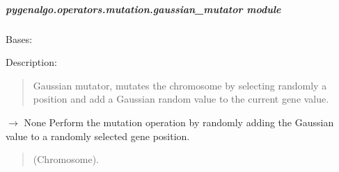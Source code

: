 \documentclass[letterpaper,10pt,english]{sphinxmanual}
\begin{document}
\subparagraph{pygenalgo.operators.mutation.gaussian\_mutator module}
\label{\detokenize{pygenalgo.operators.mutation:module-pygenalgo.operators.mutation.gaussian_mutator}}\label{\detokenize{pygenalgo.operators.mutation:pygenalgo-operators-mutation-gaussian-mutator-module}}

\begin{fulllineitems}
\label{\detokenize{pygenalgo.operators.mutation:pygenalgo.operators.mutation.gaussian_mutator.GaussianMutator}}
\pysigstartsignatures
\pysiglinewithargsret
{}
{}
{}
\pysigstopsignatures
\sphinxAtStartPar
Bases: {\hyperref[\detokenize{pygenalgo.operators.mutation:pygenalgo.operators.mutation.mutate_operator.MutationOperator}]{}}

\sphinxAtStartPar
Description:
\begin{quote}

\sphinxAtStartPar
Gaussian mutator, mutates the chromosome by selecting randomly a position
and add a Gaussian random value to the current gene value.
\end{quote}

\begin{fulllineitems}
\label{\detokenize{pygenalgo.operators.mutation:pygenalgo.operators.mutation.gaussian_mutator.GaussianMutator.mutate}}
\pysigstartsignatures
\pysiglinewithargsret
{}
{}
{{ $\rightarrow$ None}}
\pysigstopsignatures
\sphinxAtStartPar
Perform the mutation operation by randomly adding the
Gaussian value to a randomly selected gene position.
\begin{quote}\begin{description}
\sphinxAtStartPar
{} \textendash{} (Chromosome).


\end{description}
\end{quote}
\end{fulllineitems}
\end{fulllineitems}
\end{document}

